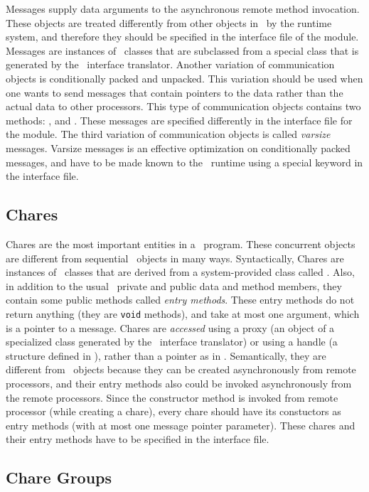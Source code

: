 Messages supply data arguments to the asynchronous remote method invocation.
These objects are treated differently from other objects in \charmpp\ by the
runtime system, and therefore they should be specified in the interface file of
the module.  Messages are instances of \CC\ classes that are subclassed from a
special class that is generated by the \charmpp\ interface translator.  Another
variation of communication objects is conditionally packed and unpacked. This
variation should be used when one wants to send messages that contain pointers
to the data rather than the actual data to other processors. This type of
communication objects contains two methods: , and .  These
messages are specified differently in the interface file for the module.  The
third variation of communication objects is called {\em varsize} messages.
Varsize messages is an effective optimization on conditionally packed messages,
and have to be made known to the \charmpp\ runtime using a special keyword in
the interface file.

\subsection{Chares}

Chares are the most important entities in a \charmpp\ program. These concurrent
objects are different from sequential \CC\ objects in many ways. Syntactically,
Chares are instances of \CC\  classes that are derived from a system-provided
class called . Also, in addition to the usual \CC\ private and public
data and method members, they contain some public methods called {\em entry
methods}. These entry methods do not return anything (they are {\tt void}
methods), and take at most one argument, which is a pointer to a message.
Chares are {\em accessed} using a proxy (an object of a specialized class
generated by the \charmpp\ interface translator) or using a handle (a  structure defined in \charmpp), rather than a pointer as in \CC.
Semantically, they are different from \CC\ objects because they can be created
asynchronously from remote processors, and their entry methods also could be
invoked asynchronously from the remote processors. Since the constructor method
is invoked from remote processor (while creating a chare), every chare should
have its constuctors as entry methods (with at most one message pointer
parameter). These chares and their entry methods have to be specified in the
interface file.

\subsection{Chare Groups}

